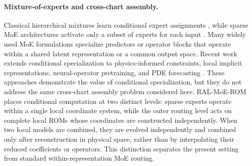 \paragraph{Mixture-of-experts and cross-chart assembly.}
Classical hierarchical mixtures learn conditional expert assignments \citep{jacobs1991,jordan1994}, while sparse MoE architectures activate only a subset of experts for each input \citep{shazeer2017,fedus2022}. Many widely used MoE formulations specialize predictors or operator blocks that operate within a shared latent representation or a common output space. Recent work extends conditional specialization to physics-informed constraints, local implicit representations, neural-operator pretraining, and PDE forecasting \citep{ICLR2024_9aeda582,NEURIPS2024_b83fae17,NEURIPS2025_2d23a999,ICLR2026_754612bd}. These approaches demonstrate the value of conditional specialization, but they do not address the same cross-chart assembly problem considered here. RAL-MoE-ROM places conditional computation at two distinct levels: sparse experts operate within a single local coordinate system, while the outer routing level acts on complete local ROMs whose coordinates are constructed independently. When two local models are combined, they are evolved independently and
combined only after reconstruction in physical space, rather than by interpolating their reduced coefficients or operators. This distinction separates the present setting from standard within-representation MoE routing.
